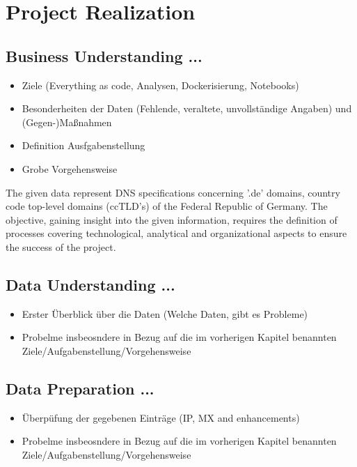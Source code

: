 \section{Project Realization}\label{sec:project-realization}

\subsection{Business Understanding ...}\label{subsec:businessunderstanding}
\begin{itemize}
    \item Ziele (Everything as code, Analysen, Dockerisierung, Notebooks)
    \item Besonderheiten der Daten (Fehlende, veraltete, unvollständige Angaben) und (Gegen-)Maßnahmen
    \item Definition Ausfgabenstellung
    \item Grobe Vorgehensweise
\end{itemize}

The given data represent DNS specifications concerning '.de' domains, country code top-level domains (ccTLD's) of the Federal Republic of Germany.
The objective, gaining insight into the given information, requires the definition of processes covering technological, analytical and organizational aspects to ensure the success of the project.

\subsection{Data Understanding ...}\label{subsec:dataunderstanding}
\begin{itemize}
    \item Erster Überblick über die Daten (Welche Daten, gibt es Probleme)
    \item Probelme insbeosndere in Bezug auf die im vorherigen Kapitel benannten Ziele/Aufgabenstellung/Vorgehensweise
\end{itemize}

\subsection{Data Preparation ...}\label{subsec:datapreparation}
\begin{itemize}
    \item Überpüfung der gegebenen Einträge (IP, MX and enhancements)
    \item Probelme insbeosndere in Bezug auf die im vorherigen Kapitel benannten Ziele/Aufgabenstellung/Vorgehensweise
\end{itemize}

